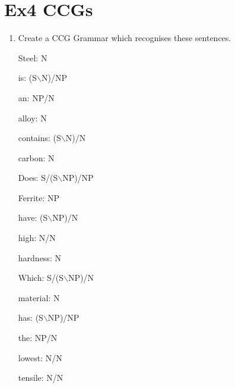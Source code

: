 \documentclass[12pt]{article}
\begin{document}
{\section{Ex4 CCGs}
\label{sec: ex4}
\begin{enumerate}[1.]
    \item Create a CCG Grammar which recognises these sentences.  
    
    Steel: N

    is: (S$\backslash$N)/NP

    an: NP/N

    alloy: N

    contains: (S$\backslash$N)/N

    carbon: N

    Does: S/(S$\backslash$NP)/NP

    Ferrite: NP

    have: (S$\backslash$NP)/N

    high: N/N

    hardness: N

    Which: S/(S$\backslash$NP)/N

    material: N

    has: (S$\backslash$NP)/NP

    the: NP/N

    lowest: N/N

    tensile: N/N 


\end{enumerate}}
\end{document}
